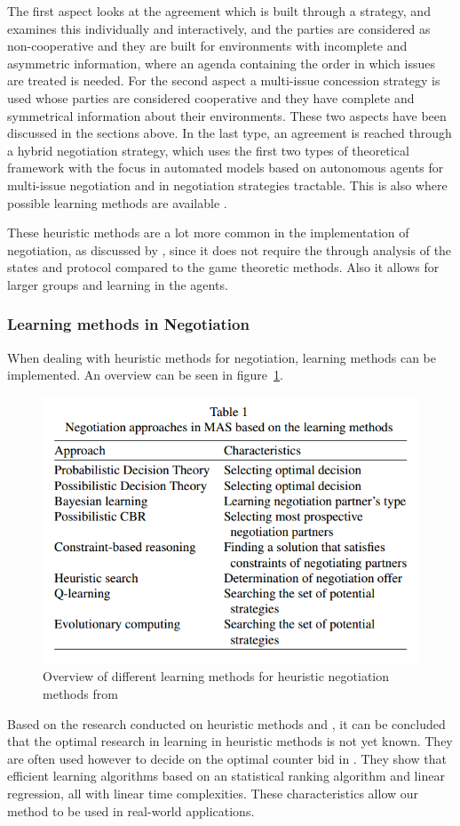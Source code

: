 	The first aspect looks at the agreement which is built through a strategy, and examines this individually and interactively, and the parties are considered as non-cooperative and they are built for environments with incomplete and asymmetric information, where an agenda containing the order in which issues are treated is needed. For the second aspect a multi-issue concession strategy is used whose parties are considered cooperative and they have complete and symmetrical information about their environments. These two aspects have been discussed in the sections above. In the last type, an agreement is reached through a hybrid negotiation strategy, which uses the first two types of theoretical framework with the focus in automated models based on autonomous agents for multi-issue negotiation and in negotiation strategies tractable. This is also where possible learning methods are available \citep{schramm2013bilateral}. 
	
	These heuristic methods are a lot more common in the implementation of negotiation, as discussed by \citet{leitao2013past, monostori2006agent}, since it does not require the through analysis of the states and protocol compared to the game theoretic methods. Also it allows for larger groups and learning in the agents.
	
\subsubsection{Learning methods in Negotiation}
When dealing with heuristic methods for negotiation, learning methods can be implemented. An overview can be seen in figure~\ref{fig:negotiationlearning}. 

\begin{figure}
\centering
\includegraphics[width=0.7\linewidth]{img/negotiation_learning}
\caption{Overview of different learning methods for heuristic negotiation methods from \citet{beheshti2014homan}}
\label{fig:negotiationlearning}
\end{figure}
Based on the research conducted on heuristic methods and \citet{jennings2001automated}, it can be concluded that the optimal research in learning in heuristic methods is not yet known. They are often used however to decide on the optimal counter bid in \citet{beheshti2014homan}. They show that efficient learning algorithms based on an statistical ranking algorithm and linear regression, all with linear time complexities. These characteristics allow our method to be used in real-world applications. 
